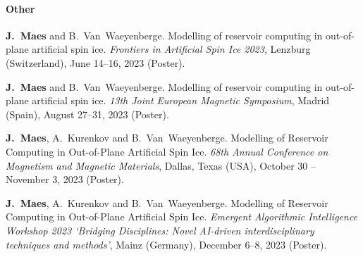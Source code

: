 \paragraph*{Other}
\begin{itemize}
    \textbf{J.~Maes} and B.~Van~Waeyenberge.
    \newblock Modelling of reservoir computing in out-of-plane artificial spin ice.
    \newblock \emph{Frontiers in Artificial Spin Ice 2023}, Lenzburg (Switzerland), June 14--16, 2023 (Poster).

    \textbf{J.~Maes} and B.~Van~Waeyenberge.
    \newblock Modelling of reservoir computing in out-of-plane artificial spin ice.
    \newblock \emph{13th Joint European Magnetic Symposium}, Madrid (Spain), August 27--31, 2023 (Poster).

    \textbf{J.~Maes}, A.~Kurenkov and B.~Van~Waeyenberge.
    \newblock Modelling of Reservoir Computing in Out-of-Plane Artificial Spin Ice.
    \newblock \emph{68th Annual Conference on Magnetism and Magnetic Materials}, Dallas, Texas (USA), October 30 -- November 3, 2023 (Poster).

    \textbf{J.~Maes}, A.~Kurenkov and B.~Van~Waeyenberge.
    \newblock Modelling of Reservoir Computing in Out-of-Plane Artificial Spin Ice.
    \newblock \emph{Emergent Algorithmic Intelligence Workshop 2023 `Bridging Disciplines: Novel AI-driven interdisciplinary techniques and methods'}, Mainz (Germany), December 6--8, 2023 (Poster).
\end{itemize}
